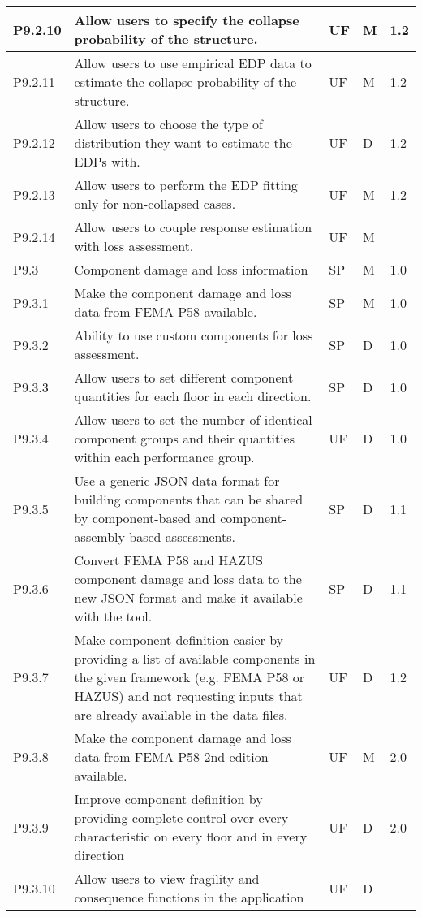 \begin{longtable}{| p{} | p{} | p{} | p{} |  p{} |}
P9.2.10 & Allow users to specify the collapse probability of the structure. & UF & M & 1.2\\ \hline
P9.2.11 & Allow users to use empirical EDP data to estimate the collapse probability of the structure. & UF & M & 1.2\\ \hline
P9.2.12 & Allow users to choose the type of distribution they want to estimate the EDPs with. & UF & D & 1.2\\ \hline
P9.2.13 & Allow users to perform the EDP fitting only for non-collapsed cases. & UF & M & 1.2\\ \hline
P9.2.14 & Allow users to couple response estimation with loss assessment. & UF & M & \\ \hline
P9.3 & Component damage and loss information & SP & M & 1.0\\ \hline
P9.3.1 & Make the component damage and loss data from FEMA P58 available. & SP & M & 1.0 \\ \hline
P9.3.2 & Ability to use custom components for loss assessment. & SP & D & 1.0 \\ \hline
P9.3.3 & Allow users to set different component quantities for each floor in each direction. & SP & D & 1.0 \\ \hline
P9.3.4 & Allow users to set the number of identical component groups and their quantities within each performance group. & UF & D & 1.0 \\ \hline
P9.3.5 & Use a generic JSON data format for building components that can be shared by component-based and component-assembly-based assessments. & SP & D & 1.1 \\ \hline
P9.3.6 & Convert FEMA P58 and HAZUS component damage and loss data to the new JSON format and make it available with the tool. & SP & D & 1.1 \\ \hline
P9.3.7 & Make component definition easier by providing a list of available components in the given framework (e.g. FEMA P58 or HAZUS) and not requesting inputs that are already available in the data files. & UF & D & 1.2 \\ \hline
P9.3.8 & Make the component damage and loss data from FEMA P58 2nd edition available. & UF & M & 2.0 \\ \hline
P9.3.9 & Improve component definition by providing complete control over every characteristic on every floor and in every direction & UF & D & 2.0 \\ \hline
P9.3.10 & Allow users to view fragility and consequence functions in the application & UF & D &  \\ \hline

\end{longtable}
